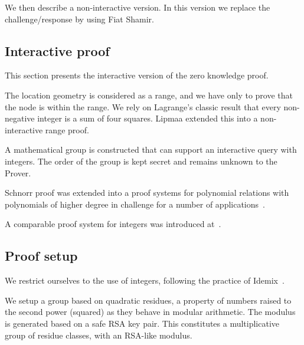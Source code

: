 \documentclass{article}
\begin{document}
We then describe a non-interactive version. In this version we replace the challenge/response by using Fiat Shamir. 

\subsection{Interactive proof}

This section presents the interactive version of the zero knowledge proof. 

The location geometry is considered as a range, and we have only to prove that the node is within the range. 
We rely on Lagrange's classic result that every non-negative integer is a sum of four squares. 
Lipmaa extended this into a non-interactive range proof. 

A mathematical group is constructed that can support an interactive query with integers. 
The order of the group is kept secret and remains unknown to the Prover.

Schnorr proof was extended into a proof systems for polynomial relations
with polynomials of higher degree in challenge
for a number of applications~\cite{F363,CF12}.

A comparable proof system for integers was introduced at~\cite{F10}.

\subsection{Proof setup}

We restrict ourselves to the use of integers, following the practice of Idemix~\cite{Idemix}.

We setup a group based on quadratic residues, a property of numbers raised to the second power (squared) as they behave in modular arithmetic. The modulus is generated based on a safe RSA key pair. This constitutes a multiplicative group of residue classes, with an RSA-like modulus.
\end{document}
